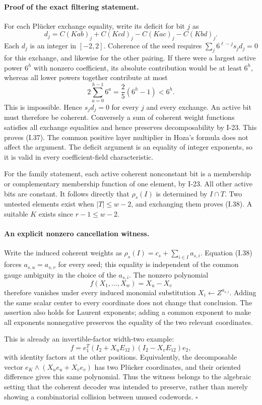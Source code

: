 \paragraph{Proof of the exact filtering statement.}
For each Pl\"ucker exchange equality, write its deficit for
bit $j$ as
\[
 d_j=C(Kab)_j+C(Kcd)_j-C(Kac)_j-C(Kbd)_j.
\]
Each $d_j$ is an integer in $[-2,2]$.  Coherence of the seed
requires $\sum_j 6^{\ell-j}s_jd_j=0$ for this exchange,
and likewise for the other pairing.  If there were a largest
active power $6^h$ with nonzero coefficient, its absolute
contribution would be at least $6^h$, whereas all lower
powers together contribute at most
\[
 2\sum_{a=0}^{h-1}6^a
   =\frac25(6^h-1)<6^h.
\]
This is impossible.  Hence $s_jd_j=0$ for every $j$ and
every exchange.  An active bit must therefore be coherent.
Conversely a sum of coherent weight functions satisfies all
exchange equalities and hence preserves decomposability by
I-23.  This proves (I.37).  The common positive layer
multiplier in Hoza's formula does not affect the argument.
The deficit argument is an equality of integer exponents,
so it is valid in every coefficient-field characteristic.

For the family statement, each active coherent nonconstant
bit is a membership or complementary membership function of
one element, by I-23.  All other active bits are constant.
It follows directly that $\rho_s(I)$ is determined by
$I\cap T$.  Two untested elements exist when $|T|\le w-2$,
and exchanging them proves (I.38).  A suitable $K$ exists
since $r-1\le w-2$.

\paragraph{An explicit nonzero cancellation witness.}
Write the induced coherent weights as
$\rho_s(I)=c_s+\sum_{i\in I}a_{s,i}$.
Equation (I.38) forces $a_{s,u}=a_{s,v}$ for every seed;
this equality is independent of the common gauge ambiguity
in the choice of the $a_{s,i}$.  The nonzero polynomial
\[
 f(X_1,\ldots,X_w)=X_u-X_v
\]
therefore vanishes under every induced monomial substitution
$X_i\leftarrow Z^{a_{s,i}}$.  Adding the same scalar center
to every coordinate does not change that conclusion.
The assertion also holds for Laurent exponents; adding a
common exponent to make all exponents nonnegative preserves
the equality of the two relevant coordinates.

This is already an invertible-factor width-two example:
\[
 f=e_1^T(I_2+X_uE_{12})(I_2-X_vE_{12})e_2,
\]
with identity factors at the other positions.  Equivalently,
the decomposable vector
$e_K\wedge(X_u e_u+X_v e_v)$ has two Pl\"ucker coordinates,
and their oriented difference gives this same polynomial.
Thus the witness belongs to the algebraic setting that the
coherent decoder was intended to preserve, rather than merely
showing a combinatorial collision between unused codewords.
\hfill$\square$

